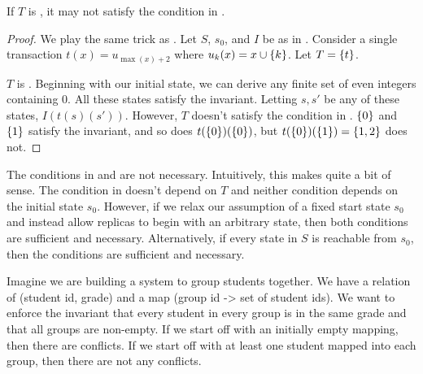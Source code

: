 \begin{claim}
  If $T$ is \Iconfluent, it may not satisfy the condition in
  .
\end{claim}
\begin{proof}
  We play the same trick as . Let $S$, $s_0$,
  and $I$ be as in . Consider a single
  transaction $t(x) = u_{\max(x) + 2}$ where $u_k(x) = x \cup \{k\}$. Let $T
  = \{t\}$.

  $T$ is \Iconfluent{}. Beginning with our initial state, we can derive any
  finite set of even integers containing $0$. All these states satisfy the
  invariant. Letting $s, s'$ be any of these states, $I(t(s)(s'))$.
  However, $T$ doesn't satisfy the condition in .
  $\{0\}$ and $\{1\}$ satisfy the invariant, and so does
  $t(\{0\})(\{0\})$, but $t(\{0\})(\{1\}) = \{1, 2\}$ does not.
\end{proof}


The conditions in  and 
are not necessary. Intuitively, this makes quite a bit of sense. The condition
in  doesn't depend on $T$ and neither condition
depends on the initial state $s_0$. However, if we relax our assumption of a
fixed start state $s_0$ and instead allow replicas to begin with an arbitrary
state, then both conditions are sufficient and necessary. Alternatively, if
every state in $S$ is reachable from $s_0$, then the conditions are sufficient
and necessary.


Imagine we are building a system to group students together. We have a relation
of (student id, grade) and a map (group id -> set of student ids). We want to
enforce the invariant that every student in every group is in the same grade
and that all groups are non-empty. If we start off with an initially empty
mapping, then there are conflicts. If we start off with at least one student
mapped into each group, then there are not any conflicts.

